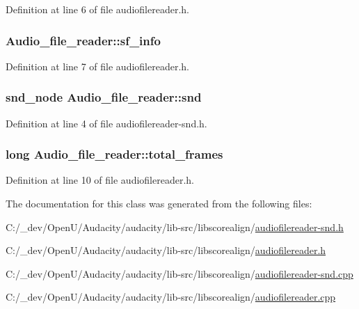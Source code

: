 Definition at line 6 of file audiofilereader.\+h.

\subsubsection[{\texorpdfstring{sf\+\_\+info}{sf_info}}]{ Audio\+\_\+file\+\_\+reader\+::sf\+\_\+info}\hypertarget{class_audio__file__reader_ae619b74b4da49881193e10580be026b6}{}\label{class_audio__file__reader_ae619b74b4da49881193e10580be026b6}


Definition at line 7 of file audiofilereader.\+h.

\subsubsection[{\texorpdfstring{snd}{snd}}]{\setlength{\rightskip}{0pt plus 5cm}snd\+\_\+node Audio\+\_\+file\+\_\+reader\+::snd}\hypertarget{class_audio__file__reader_a635812c920d380ed1c699a0d9ca003ce}{}\label{class_audio__file__reader_a635812c920d380ed1c699a0d9ca003ce}


Definition at line 4 of file audiofilereader-\/snd.\+h.

\subsubsection[{\texorpdfstring{total\+\_\+frames}{total_frames}}]{\setlength{\rightskip}{0pt plus 5cm}long Audio\+\_\+file\+\_\+reader\+::total\+\_\+frames}\hypertarget{class_audio__file__reader_ae8e5c2ab253c670ae5fa5a7d0b6980c5}{}\label{class_audio__file__reader_ae8e5c2ab253c670ae5fa5a7d0b6980c5}


Definition at line 10 of file audiofilereader.\+h.



The documentation for this class was generated from the following files\+:\begin{DoxyCompactItemize}
\item 
C\+:/\+\_\+dev/\+Open\+U/\+Audacity/audacity/lib-\/src/libscorealign/\hyperlink{audiofilereader-snd_8h}{audiofilereader-\/snd.\+h}\item 
C\+:/\+\_\+dev/\+Open\+U/\+Audacity/audacity/lib-\/src/libscorealign/\hyperlink{audiofilereader_8h}{audiofilereader.\+h}\item 
C\+:/\+\_\+dev/\+Open\+U/\+Audacity/audacity/lib-\/src/libscorealign/\hyperlink{audiofilereader-snd_8cpp}{audiofilereader-\/snd.\+cpp}\item 
C\+:/\+\_\+dev/\+Open\+U/\+Audacity/audacity/lib-\/src/libscorealign/\hyperlink{audiofilereader_8cpp}{audiofilereader.\+cpp}\end{DoxyCompactItemize}
